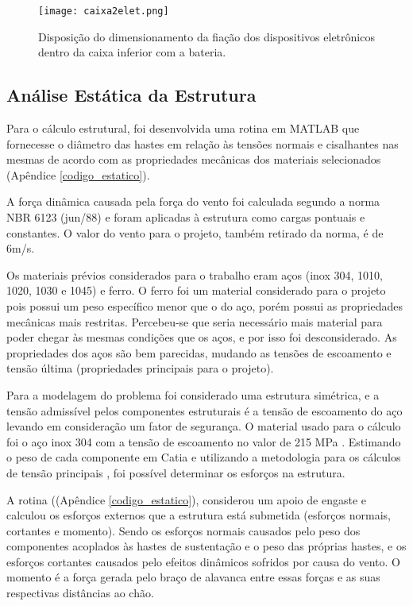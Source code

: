 \begin{figure}[h]
	\centering
    \texttt{[image: caixa2elet.png]}
    \caption{Disposição do dimensionamento da fiação dos dispositivos eletrônicos dentro da caixa inferior com a bateria.}
    \label{caixa2elet}
\end{figure}



\subsection{Análise Estática da Estrutura}

Para o cálculo estrutural, foi desenvolvida uma rotina em MATLAB que fornecesse o diâmetro das hastes em relação às tensões normais e cisalhantes nas mesmas de acordo com as propriedades mecânicas dos materiais selecionados (Apêndice \ref{codigo_estatico}).


A força dinâmica causada pela força do vento foi calculada segundo a norma NBR 6123 (jun/88) \cite{vento} e foram aplicadas à estrutura como cargas pontuais e constantes. O valor do vento para o projeto, também retirado da norma, é de 6m/s.

Os materiais prévios considerados para o trabalho eram aços (inox 304, 1010, 1020, 1030 e 1045) e ferro. O ferro foi um material considerado para o projeto pois possui um peso específico menor que o do aço, porém possui as propriedades mecânicas mais restritas. Percebeu-se que seria necessário mais material para poder chegar às mesmas condições que os aços, e por isso foi desconsiderado. As propriedades dos aços são bem parecidas, mudando as tensões de escoamento e tensão última (propriedades principais para o projeto).

Para a modelagem do problema foi considerado uma estrutura simétrica, e a tensão admissível pelos componentes estruturais é a tensão de escoamento do aço levando em consideração um fator de segurança. O material usado para o cálculo foi o aço inox 304 com a tensão de escoamento no valor de 215 MPa \cite{callister}. Estimando o peso de cada componente em Catia e utilizando a metodologia para os cálculos de tensão principais \cite{beer}, foi possível determinar os esforços na estrutura.

A rotina ((Apêndice \ref{codigo_estatico}), considerou um apoio de engaste e calculou os esforços externos que a estrutura está submetida (esforços normais, cortantes e momento). Sendo os esforços normais causados pelo peso dos componentes acoplados às hastes de sustentação e o peso das próprias hastes, e os esforços cortantes causados pelo efeitos dinâmicos sofridos por causa do vento. O momento é a força gerada pelo braço de alavanca entre essas forças e as suas respectivas distâncias ao chão.


